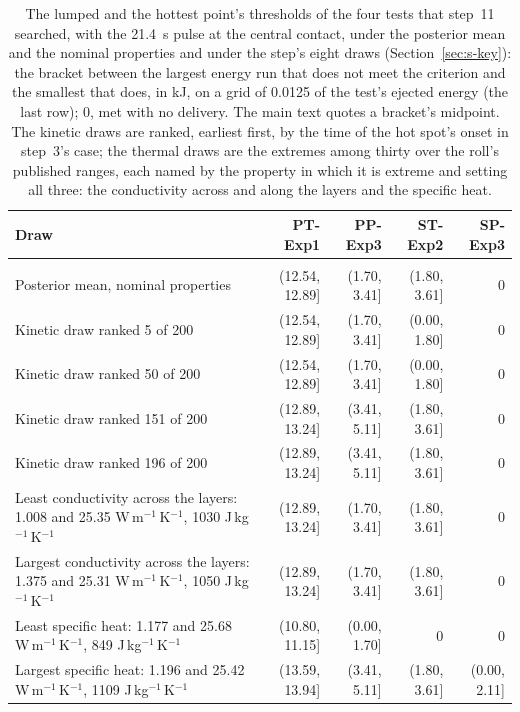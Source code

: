 \begin{table}[!htbp]
\centering
\scriptsize
\caption{The lumped and the hottest point's thresholds of the four tests that step~11 searched, with the 21.4~s pulse at the central contact, under the posterior mean and the nominal properties and under the step's eight draws (Section~\ref{sec:s-key}): the bracket between the largest energy run that does not meet the criterion and the smallest that does, in kJ, on a grid of 0.0125 of the test's ejected energy (the last row); 0, met with no delivery. The main text quotes a bracket's midpoint. The kinetic draws are ranked, earliest first, by the time of the hot spot's onset in step~3's case; the thermal draws are the extremes among thirty over the roll's published ranges, each named by the property in which it is extreme and setting all three: the conductivity across and along the layers and the specific heat.}
\label{tab:s-step11}
\setlength{\tabcolsep}{4pt}
\begin{tabular}{>{\raggedright\arraybackslash}p{}rrrr}
\toprule
Draw & PT-Exp1 & PP-Exp3 & ST-Exp2 & SP-Exp3 \\
\midrule
\multicolumn{5}{l}{\textit{The lumped threshold}} \\
Posterior mean, nominal properties & (12.54, 12.89] & (1.70, 3.41] & (1.80, 3.61] & 0 \\
\addlinespace[2pt]
Kinetic draw ranked 5 of 200 & (12.54, 12.89] & (1.70, 3.41] & (0.00, 1.80] & 0 \\
Kinetic draw ranked 50 of 200 & (12.54, 12.89] & (1.70, 3.41] & (0.00, 1.80] & 0 \\
Kinetic draw ranked 151 of 200 & (12.89, 13.24] & (3.41, 5.11] & (1.80, 3.61] & 0 \\
Kinetic draw ranked 196 of 200 & (12.89, 13.24] & (3.41, 5.11] & (1.80, 3.61] & 0 \\
\addlinespace[2pt]
Least conductivity across the layers: 1.008 and 25.35 W\,m$^{-1}$\,K$^{-1}$, 1030 J\,kg$^{-1}$\,K$^{-1}$ & (12.89, 13.24] & (1.70, 3.41] & (1.80, 3.61] & 0 \\
Largest conductivity across the layers: 1.375 and 25.31 W\,m$^{-1}$\,K$^{-1}$, 1050 J\,kg$^{-1}$\,K$^{-1}$ & (12.89, 13.24] & (1.70, 3.41] & (1.80, 3.61] & 0 \\
Least specific heat: 1.177 and 25.68 W\,m$^{-1}$\,K$^{-1}$, 849 J\,kg$^{-1}$\,K$^{-1}$ & (10.80, 11.15] & (0.00, 1.70] & 0 & 0 \\
Largest specific heat: 1.196 and 25.42 W\,m$^{-1}$\,K$^{-1}$, 1109 J\,kg$^{-1}$\,K$^{-1}$ & (13.59, 13.94] & (3.41, 5.11] & (1.80, 3.61] & (0.00, 2.11] \\

\end{tabular}
\end{table}
